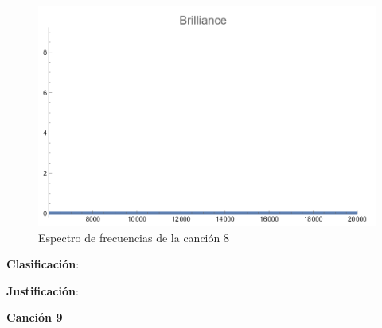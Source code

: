\documentclass[12pt, letterpaper]{article}
\begin{document}
\begin{figure}[H]
\begin{minipage}{.3\textwidth}
  \end{minipage}
  \begin{minipage}{0.03\textwidth}\end{minipage}
  \begin{minipage}{.3\textwidth}
    \centering
    \includegraphics[width=.9\linewidth]{imgs/Cancion8/brilliance.png}
  \end{minipage}
  \caption{Espectro de frecuencias de la canción 8}
  \label{fig:esp08}
\end{figure}

\textbf{Clasificación}: 

\textbf{Justificación}: 

\newpage

\textbf{\large{Canción 9}}
\end{document}
